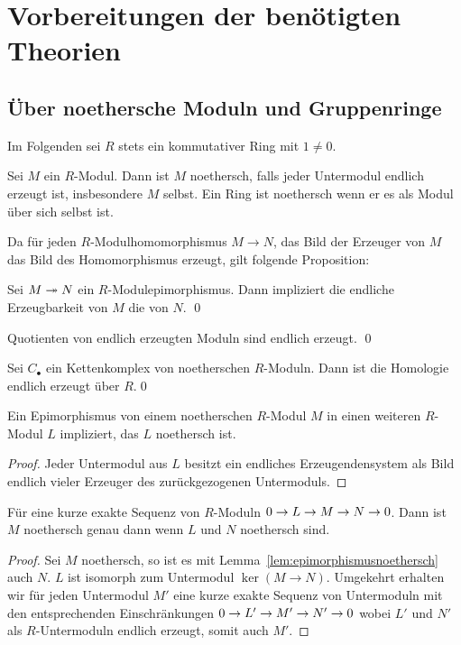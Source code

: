 

\section{Vorbereitungen der benötigten Theorien}
\label{sec:vorbereitungen}

\subsection{Über noethersche Moduln und Gruppenringe}
\label{sec:noetherianprinciples}
Im Folgenden sei $R$ stets ein kommutativer Ring mit $1\neq 0$.

Sei $M$ ein $R$-Modul. Dann ist $M$ noethersch, falls jeder Untermodul endlich erzeugt ist, insbesondere $M$ selbst. Ein Ring ist noethersch wenn er es als Modul über sich selbst ist. 

Da für jeden $R$-Modulhomomorphismus $M\to N$, das Bild der Erzeuger von $M$ das Bild des Homomorphismus erzeugt, gilt folgende Proposition:
\begin{prop}
	Sei $M \twoheadrightarrow N$ ein $R$-Modulepimorphismus. Dann impliziert die endliche Erzeugbarkeit von $M$ die von $N$. \qed
\end{prop}
\begin{cor}
	Quotienten von endlich erzeugten Moduln sind endlich erzeugt. \qed
\end{cor}
\begin{cor}
\label{cor:noethchaincomplex}
	Sei $C_\bullet$ ein Kettenkomplex von noetherschen $R$-Moduln. Dann ist die Homologie endlich erzeugt über $R$.\qed
\end{cor}

\begin{lem}
\label{lem:epimorphismusnoethersch}
	Ein Epimorphismus von einem noetherschen $R$-Modul $M$ in einen weiteren $R$-Modul $L$ impliziert, das $L$ noethersch ist.
\end{lem}
\begin{proof}
	Jeder Untermodul aus $L$ besitzt ein endliches Erzeugendensystem als Bild endlich vieler Erzeuger des zurückgezogenen Untermoduls.
\end{proof}
\begin{lem}
\label{lem:exaktnoethersch}
	Für eine kurze exakte Sequenz von $R$-Moduln $0\to L\to M\to N\to0$. Dann ist $M$ noethersch genau dann wenn $L$ und $N$ noethersch sind.
\end{lem}
\begin{proof}
	Sei $M$ noethersch, so ist es mit Lemma~\ref{lem:epimorphismusnoethersch} auch $N$. $L$ ist isomorph zum Untermodul $\ker(M\to N)$. Umgekehrt erhalten wir für jeden Untermodul $M'$ eine kurze exakte Sequenz von Untermoduln mit den entsprechenden Einschränkungen $0\to L'\to M'\to N'\to0$ wobei $L'$ und $N'$ als $R$-Untermoduln endlich erzeugt, somit auch $M'$.
\end{proof}


